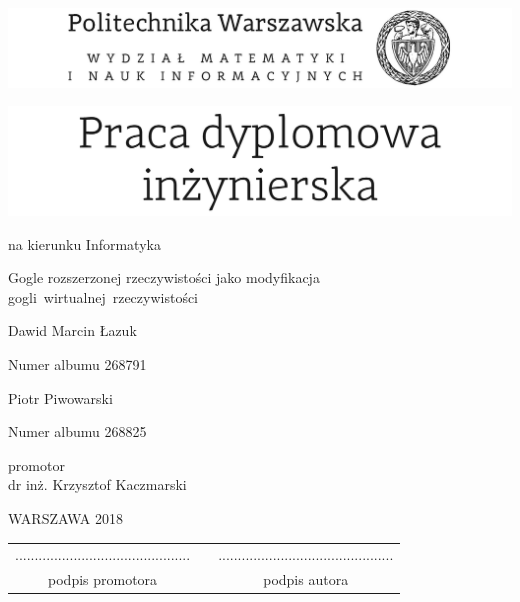 \documentclass[12pt,twoside,a4paper]{article}
\def\discipline{Informatyka} %
\def\title{Gogle rozszerzonej rzeczywistości jako modyfikacja gogli~wirtualnej~rzeczywistości}
\def\authori{Dawid Marcin Łazuk}
\def\albumi{268791}
\def\authorii{Piotr Piwowarski}
\def\albumii{268825}
\def\supervisor{dr inż. Krzysztof Kaczmarski}
\def\year{2018}
\begin{document}
\sloppy
\pagestyle{empty}


\includegraphics[scale=1.]{politechnika} 

\begin{center}
\vspace{40pt}

\includegraphics[scale=1.]{praca_inz}  %

{ \arial na kierunku \discipline

\vspace{30pt}
{\arial \large \title}

\vspace{40pt}

{\arial \huge \authori }

\vspace{5pt}

Numer albumu \albumi

\vspace {20pt}
{\arial \huge \authorii}

\vspace{5pt}

Numer albumu \albumii

\vspace{40pt}

promotor \\
{\arial \supervisor}

\vspace{15pt}

 \vfill
WARSZAWA \year \\
}
\end{center}


\newpage
\null

\vfill

\begin{center}
\begin{tabular}[t]{ccc}
............................................. & \hspace*{100pt} & .............................................\\
podpis promotora & \hspace*{100pt} & podpis autora
\end{tabular}
\end{center}
\end{document}

